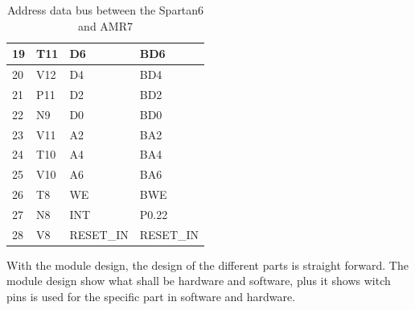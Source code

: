 \begin{table}[H]
\begin{tabular}{|p{3cm}|p{3cm}|p{3cm}|p{3cm}|}
        19          & T11          & D6               & BD6               \\ \hline
        20          & V12          & D4               & BD4               \\ \hline
        21          & P11          & D2               & BD2               \\ \hline
        22          & N9           & D0               & BD0               \\ \hline
        23          & V11          & A2               & BA2               \\ \hline
        24          & T10          & A4               & BA4               \\ \hline
        25          & V10          & A6               & BA6               \\ \hline
        26          & T8           & WE               & BWE               \\ \hline
        27          & N8           & INT              & P0.22             \\ \hline
        28          & V8           & RESET\_IN        & RESET\_IN         \\
        \hline
    \end{tabular}
    \caption{Address data bus between the Spartan6 and AMR7}
\end{table}

With the module design, the design of the different parts is straight forward. The module design show what shall be hardware and software, plus it shows witch pins is used for the specific part in software and hardware.

